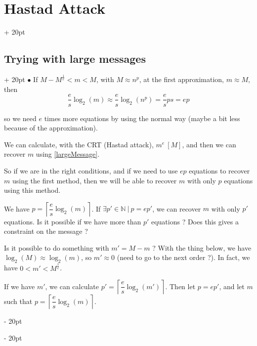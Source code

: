 \documentclass[a4paper, 12pt, twoside]{article}
\newcommand{\N}{\mathbb{N}} %
\newcommand{\ceil}[1]{\left\lceil #1 \right\rceil}
\newcommand{\ind}[1][20pt]{\advance\leftskip + #1}
\newcommand{\deind}[1][20pt]{\advance\leftskip - #1}
\newenvironment{indt}[2][20pt]{#2 \par \ind[#1]}{\par \deind} %
\begin{document}
\begin{indt}{\section{Hastad Attack}}

        \vspace{12pt}
        
        \begin{indt}{\subsection{Trying with large messages}}
            $\bullet$ If $M - M^{\tfrac 1 e} < m < M$, with $M \approx n^p$, at the first approximation, $m \approx M$, then
            \[
                \dfrac e s \log_2(m)
                \approx \dfrac e s \log_2(n^p)
                = \dfrac e s p s
                = ep
            \]
            
            so we need $e$ times more equations by using the normal way (maybe a bit less because of the approximation).
            
            We can calculate, with the CRT (Hastad attack), $m^e \ [M]$, and then we can recover $m$ using \ref{largeMessage}.
            
            \begin{pseudocode}
                So if we are in the right conditions, and if we need to use $ep$ equations to recover $m$ using the first method, then we will be able to recover $m$ with only $p$ equations using this method.
            \end{pseudocode}
            
            We have $p = \ceil{\dfrac e s \log_2(m)}$. If $\exists p' \in \N\ |\ p = ep'$, we can recover $m$ with only $p'$ equations. Is it possible if we have more than $p'$ equations ? Does this gives a constraint on the message ?
            
            \vspace{6pt}
            
            Is it possible to do something with $m' = M - m$ ?
            With the thing below, we have $\log_2(M) \approx \log_2(m)$, so $m' \approx 0$ (need to go to the next order ?).
            In fact, we have $0 < m' < M^{\tfrac 1 e}$.
            
            \vspace{6pt}
            
            If we have $m'$, we can calculate $p' = \ceil{\dfrac e s \log_2(m')}$.
            Then let $p = ep'$, and let $m$ such that $p = \ceil{\dfrac e s \log_2(m)}$.
            

\end{indt}
\end{indt}
\end{document}
